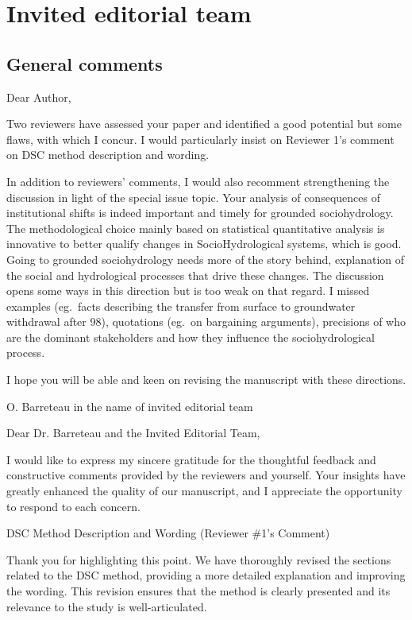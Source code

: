 \section*{Invited editorial team}\label{editor}

\subsection*{General comments}
\RC{} Dear Author,

\RC*{} Two reviewers have assessed your paper and identified a good potential but some flaws, with which I concur. I would particularly insist on Reviewer 1's comment on DSC method description and wording.

\RC*{} In addition to reviewers' comments, I would also recomment strengthening the discussion in light of the special issue topic. Your analysis of consequences of institutional shifts is indeed important and timely for grounded sociohydrology. The methodological choice mainly based on statistical quantitative analysis is innovative to better qualify changes in SocioHydrological systems, which is good. Going to grounded sociohydrology needs more of the story behind, explanation of the social and hydrological processes that drive these changes. The discussion opens some ways in this direction but is too weak on that regard. I missed examples (eg.\ facts describing the transfer from surface to groundwater withdrawal after 98), quotations (eg.\ on bargaining arguments), precisions of who are the dominant stakeholders and how they influence the sociohydrological process.

\RC*{} I hope you will be able and keen on revising the manuscript with these directions.

\RC*{} O. Barreteau in the name of invited editorial team

\AR{} Dear Dr. Barreteau and the Invited Editorial Team,

\AR*{} I would like to express my sincere gratitude for the thoughtful feedback and constructive comments provided by the reviewers and yourself. Your insights have greatly enhanced the quality of our manuscript, and I appreciate the opportunity to respond to each concern.

\AR{} DSC Method Description and Wording (Reviewer \#1's Comment)

\AR*{} Thank you for highlighting this point. We have thoroughly revised the sections related to the DSC method, providing a more detailed explanation and improving the wording. This revision ensures that the method is clearly presented and its relevance to the study is well-articulated.

